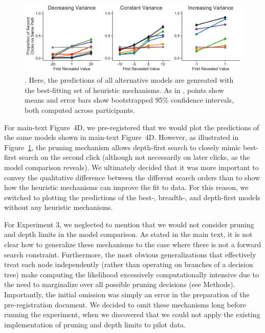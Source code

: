 \begin{figure}[t!]
    \centering
    \includegraphics[width=\textwidth]{figs/planning/second_click_alt.pdf}
    \caption{. Here, the predictions of all alternative models are genreated with the best-fitting set of heuristic mechanisms. As in , points show means and error bars show bootstrapped 95\% confidence intervals, both computed across participants.
    }
    \label{fig:second_click_alt}
\end{figure}

For main-text Figure~4D, we pre-registered that we would plot the predictions of the same models shown in main-text Figure~4D. However, as illustrated in Figure~\ref{fig:second_click_alt}, the pruning mechanism allows depth-first search to closely mimic best-first search on the second click (although not necessarily on later clicks, as the model comparison reveals). We ultimately decided that it was more important to convey the qualitative difference between the different search orders than to show how the heuristic mechanisms can improve the fit to data. For this reason, we switched to plotting the predictions of the best-, breadth-, and depth-first models without any heuristic mechanisms.

For Experiment 3, we neglected to mention that we would not consider pruning and depth limits in the model comparison. As stated in the main text, it is not clear how to generalize these mechanisms to the case where there is not a forward search constraint. Furthermore, the most obvious generalizations that effectively treat each node independently (rather than operating on branches of a decision tree) make computing the likelihood excessively computationally intensive due to the need to marginalize over all possible pruning decisions (see Methods). Importantly, the initial omission was simply an error in the preparation of the pre-registration document. We decided to omit these mechanisms long before running the experiment, when we discovered that we could not apply the existing implementation of pruning and depth limits to pilot data.

